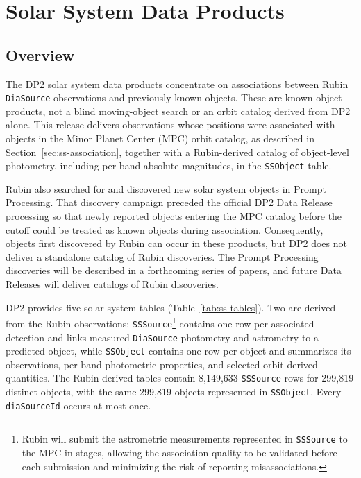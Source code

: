 
\section{Solar System Data Products}
\label{sec:ss-products}

\subsection{Overview}

The \gls{DP2} solar system data products concentrate on associations between Rubin
\texttt{DiaSource} observations and previously known objects.  These are
known-object products, not a blind moving-object search or an orbit catalog
derived from \gls{DP2} alone.  This release delivers observations whose positions
were associated with objects in the Minor Planet Center (\gls{MPC}) orbit catalog,
as described in Section~\ref{sec:ss-association}, together with a
Rubin-derived catalog of object-level photometry, including per-band absolute
magnitudes, in the \texttt{SSObject} table.

Rubin also searched for and discovered new solar system objects in Prompt
Processing.  That discovery campaign preceded the official DP2 Data \gls{Release}
processing so that newly reported objects entering the \gls{MPC} catalog before the
cutoff could be treated as known objects during association.  Consequently,
objects first discovered by Rubin can occur in these products, but \gls{DP2} does
not deliver a standalone catalog of Rubin discoveries.  The \gls{Prompt Processing}
discoveries will be described in a forthcoming series of papers, and future
Data Releases will deliver catalogs of Rubin discoveries.

\gls{DP2} provides five solar system tables (Table~\ref{tab:ss-tables}).  Two are
derived from the Rubin observations: \texttt{SSSource}\footnote{Rubin will
submit the astrometric measurements represented in \texttt{SSSource} to the
\gls{MPC} in stages, allowing the association quality to be validated before each
submission and minimizing the risk of reporting misassociations.} contains
one row per associated detection and links measured \texttt{DiaSource}
photometry and \gls{astrometry} to a predicted object, while \texttt{SSObject}
contains one row per object and summarizes its observations, per-band
photometric properties, and selected orbit-derived quantities.  The
Rubin-derived tables contain 8,149,633 \texttt{SSSource} rows for 299,819
distinct objects, with the same 299,819 objects represented in
\texttt{SSObject}.  Every \texttt{diaSourceId} occurs at most once.

